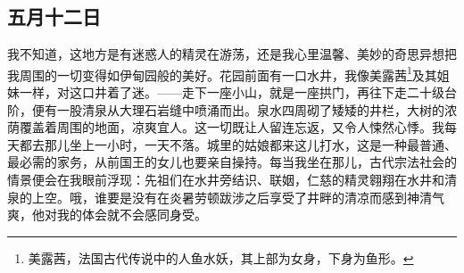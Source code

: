 \documentclass[11pt,oneside]{book}
\begin{document}
\begin{common-format}
\section{五月十二日}
我不知道，这地方是有迷惑人的精灵在游荡，还是我心里温馨、美妙的奇思异想把我周围的一切变得如伊甸园般的美好。花园前面有一口水井，我像美露茜\footnote{美露茜，法国古代传说中的人鱼水妖，其上部为女身，下身为鱼形。}及其姐妹一样，对这口井着了迷。——走下一座小山，就是一座拱门，再往下走二十级台阶，便有一股清泉从大理石岩缝中喷涌而出。泉水四周砌了矮矮的井栏，大树的浓荫覆盖着周围的地面，凉爽宜人。这一切既让人留连忘返，又令人悚然心悸。我每天都去那儿坐上一小时，一天不落。城里的姑娘都来这儿打水，这是一种最普通、最必需的家务，从前国王的女儿也要亲自操持。每当我坐在那儿，古代宗法社会的情景便会在我眼前浮现：先祖们在水井旁结识、联姻，仁慈的精灵翱翔在水井和清泉的上空。哦，谁要是没有在炎暑劳顿跋涉之后享受了井畔的清凉而感到神清气爽，他对我的体会就不会感同身受。



\end{common-format}
\end{document}
